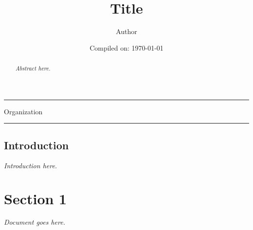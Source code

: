 \documentclass[11pt]{article}
\title{\textbf{Title}}
\author{Author}
\date{Compiled on: \today}
\begin{document}
\newcommand{\makecover}{
\begin{flushleft}
    \huge\bfseries \theTitle
\end{flushleft}
    \rule{\linewidth}{5pt} %
    \begin{flushright}
            \thedate
    \end{flushright}

\vfill
\begin{flushleft}
\Large \bfseries{\theauthor}

\Large{Organization}
\end{flushleft}
    \rule{\linewidth}{5pt}
\pagebreak
}
\makecover
\maketitle
{}
\setcounter{section}{0}

\begin{abstract}
        \emph{Abstract here.}
\end{abstract}

\subsection*{Introduction}
\emph{Introduction here.}

\newpage

\tableofcontents



\newpage
{}
\section{Section 1}
\emph{Document goes here.}
\end{document}
